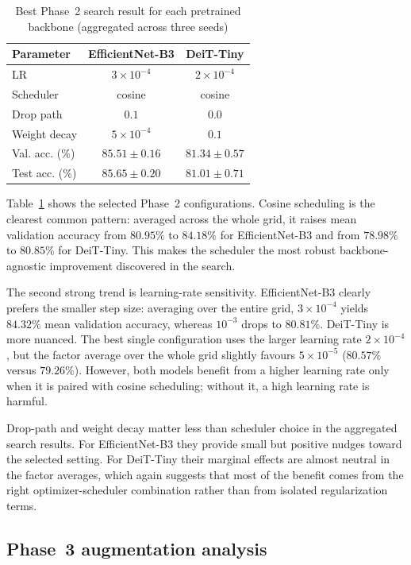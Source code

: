 \documentclass[12pt,a4paper]{article}
\begin{document}
\begin{table}[t!]
\centering
\caption{Best Phase~2 search result for each pretrained backbone (aggregated across three seeds)}
\label{tab:phase2-best}
\smallskip
\small
\begin{tabular}{@{}lcc@{}}
\toprule
\textbf{Parameter} & \textbf{EfficientNet-B3} & \textbf{DeiT-Tiny} \\
\midrule
LR & $3 \times 10^{-4}$ & $2 \times 10^{-4}$ \\
Scheduler & cosine & cosine \\
Drop path & $0.1$ & $0.0$ \\
Weight decay & $5 \times 10^{-4}$ & $0.1$ \\
Val. acc. (\%) & $85.51 \pm 0.16$ & $81.34 \pm 0.57$ \\
Test acc. (\%) & $85.65 \pm 0.20$ & $81.01 \pm 0.71$ \\
\bottomrule
\end{tabular}
\end{table}

Table~\ref{tab:phase2-best} shows the selected Phase~2 configurations. Cosine scheduling is the clearest common pattern: averaged across the whole grid, it raises mean validation accuracy from $80.95\%$ to $84.18\%$ for EfficientNet-B3 and from $78.98\%$ to $80.85\%$ for DeiT-Tiny. This makes the scheduler the most robust backbone-agnostic improvement discovered in the search.

The second strong trend is learning-rate sensitivity. EfficientNet-B3 clearly prefers the smaller step size: averaging over the entire grid, $3 \times 10^{-4}$ yields $84.32\%$ mean validation accuracy, whereas $10^{-3}$ drops to $80.81\%$. DeiT-Tiny is more nuanced. The best single configuration uses the larger learning rate $2 \times 10^{-4}$, but the factor average over the whole grid slightly favours $5 \times 10^{-5}$ ($80.57\%$ versus $79.26\%$). However, both models benefit from a higher learning rate only when it is paired with cosine scheduling; without it, a high learning rate is harmful.

Drop-path and weight decay matter less than scheduler choice in the aggregated search results. For EfficientNet-B3 they provide small but positive nudges toward the selected setting. For DeiT-Tiny their marginal effects are almost neutral in the factor averages, which again suggests that most of the benefit comes from the right optimizer-scheduler combination rather than from isolated regularization terms.

\subsection{Phase~3 augmentation analysis}
\label{subsec:phase3-results}
\end{document}
